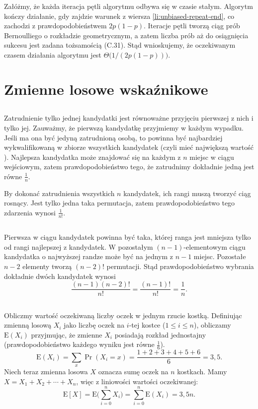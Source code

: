 Załóżmy, że każda iteracja pętli algorytmu odbywa się w czasie stałym. Algorytm kończy działanie, gdy zajdzie warunek z wiersza \ref{li:unbiased-repeat-end}, co zachodzi z prawdopodobieństwem $2p(1-p)$. Iteracje pętli tworzą ciąg prób Bernoulliego o rozkładzie geometrycznym, a zatem liczba prób aż do osiągnięcia sukcesu jest zadana tożsamością (C.31). Stąd wnioskujemy, że oczekiwanym czasem działania algorytmu jest $\Theta\bigl(1/(2p(1-p))\bigr)$.

\section{Zmienne losowe wskaźnikowe}

\subsection{} %
Zatrudnienie tylko jednej kandydatki jest równoważne przyjęciu pierwszej z nich i tylko jej. Zauważmy, że pierwszą kandydatkę przyjmiemy w każdym wypadku. Jeśli ma ona być jedyną zatrudnioną osobą, to powinna być najbardziej wykwalifikowaną w zbiorze wszystkich kandydatek (czyli mieć największą wartość ). Najlepsza kandydatka może znajdować się na każdym z $n$ miejsc w ciągu wejściowym, zatem prawdopodobieństwo tego, że zatrudnimy dokładnie jedną jest równe $\frac{1}{n}$.

By dokonać zatrudnienia wszystkich $n$ kandydatek, ich rangi muszą tworzyć ciąg rosnący. Jest tylko jedna taka permutacja, zatem prawdopodobieństwo tego zdarzenia wynosi $\frac{1}{n!}$. 

\subsection{} %
Pierwsza w ciągu kandydatek powinna być taka, której ranga jest mniejsza tylko od rangi najlepszej z kandydatek. W pozostałym $(n-1)$-elementowym ciągu kandydatka o najwyższej randze może być na jednym z $n-1$ miejsc. Pozostałe $n-2$ elementy tworzą $(n-2)!$ permutacji. Stąd prawdopodobieństwo wybrania dokładnie dwóch kandydatek wynosi
\[
	\frac{(n-1)(n-2)!}{n!} = \frac{(n-1)!}{n!} = \frac{1}{n}.
\]

\subsection{} %
Obliczmy wartość oczekiwaną liczby oczek w jednym rzucie kostką. Definiując zmienną losową $X_i$ jako liczbę oczek na $i$-tej kostce ($1\le i\le n$), obliczamy $\mathrm{E}(X_i)$ przyjmując, że zmienne $X_i$ posiadają rozkład jednostajny (prawdopodobieństwo każdego wyniku jest równe $\frac{1}{6}$).
\[
	\mathrm{E}(X_i) = \sum_x\Pr(X_i=x) = \frac{1+2+3+4+5+6}{6} = 3{,}5.
\]
Niech teraz zmienna losowa $X$ oznacza sumę oczek na $n$ kostkach. Mamy $X=X_1+X_2+\cdots+X_n$, więc z liniowości wartości oczekiwanej:
\[
	\mathrm{E}[X] = \mathrm{E}\biggl(\sum_{i=0}^nX_i\biggr) = \sum_{i=0}^n\mathrm{E}(X_i) = 3{,}5n.
\]

